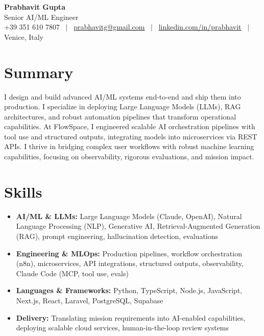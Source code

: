 \documentclass[a4paper,10pt]{article}
\begin{document}
\begin{minipage}[c]{0.80\textwidth}
 {\Huge\bfseries Prabhavit Gupta}\\[3pt]
 {\color{accent}\large Senior AI/ML Engineer}\\[6pt]
 {\footnotesize +39 351 610 7807 ~$\vert$~
 \href{mailto:prabhavitg@gmail.com}{prabhavitg@gmail.com} ~$\vert$~
 \href{https://www.linkedin.com/in/prabhavit/}{linkedin.com/in/prabhavit} ~$\vert$~
 Venice, Italy}
\end{minipage}\hfill
\begin{minipage}[c]{0.18\textwidth}
 \raggedleft\vspace{2cm}
\end{minipage}
\vspace{-2pt}

\section{Summary}
I design and build advanced AI/ML systems end-to-end and ship them into production. I specialize in deploying Large Language Models (LLMs), RAG architectures, and robust automation pipelines that transform operational capabilities. At FlowSpace, I engineered scalable AI orchestration pipelines with tool use and structured outputs, integrating models into microservices via REST APIs. I thrive in bridging complex user workflows with robust machine learning capabilities, focusing on observability, rigorous evaluations, and mission impact.

\section{Skills}
\begin{itemize}
 \item \textbf{AI/ML \& LLMs:} Large Language Models (Claude, OpenAI), Natural Language Processing (NLP), Generative AI, Retrieval-Augmented Generation (RAG), prompt engineering, hallucination detection, evaluations
 \item \textbf{Engineering \& MLOps:} Production pipelines, workflow orchestration (n8n), microservices, API integrations, structured outputs, observability, Claude Code (MCP, tool use, evals)
 \item \textbf{Languages \& Frameworks:} Python, TypeScript, Node.js, JavaScript, Next.js, React, Laravel, PostgreSQL, Supabase
 \item \textbf{Delivery:} Translating mission requirements into AI-enabled capabilities, deploying scalable cloud services, human-in-the-loop review systems
\end{itemize}
\end{document}
